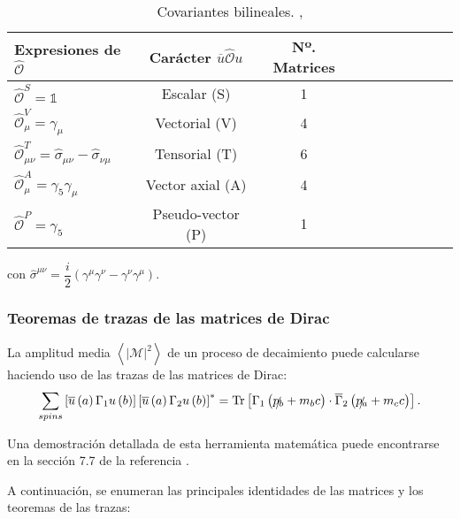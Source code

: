 \begin{table}[h]
	\centering
	\begin{tabular}{l*{8}{c}r}
\hline
Expresiones de $\widehat{\mathcal{O}}$  & Carácter $\overline{u}\widehat{\mathcal{O}}u$ & Nº. Matrices\\ 
\hline
$\widehat{\mathcal{O}}^{S} = \mathbb{1}$ & Escalar (S) & 1\\
$\widehat{\mathcal{O}}_{\mu}^{V} = \gamma_{\mu}$ & Vectorial (V) & 4 &\\
$\widehat{\mathcal{O}}^{T}_{\mu\nu} = \hat{\sigma}_{\mu\nu}-\widehat{\sigma}_{\nu\mu}$ & Tensorial (T) & 6\\
$\widehat{\mathcal{O}}_{\mu}^{A} = \gamma_{5}\gamma_{\mu}$ & Vector axial (A) & 4\\
$\widehat{\mathcal{O}}^{P} = \gamma_{5}$ & Pseudo-vector (P) & 1\\
\hline
	\end{tabular}
\caption[Covariantes bilineales]{Covariantes bilineales. \cite{MCR}, \cite{GreinerRQM}}
\label{tab:bilinear_covariant}
\end{table}

con $\hat{\sigma}^{\mu\nu}= \dfrac{i}{2} \left(\gamma^{\mu}\gamma^{\nu} - \gamma^{\nu}\gamma^{\mu} \right)$.

\subsubsection{Teoremas de trazas de las matrices de Dirac}\label{sec:trazas}
La amplitud media $\left\langle|\mathcal{M}|^2\right\rangle$ de un proceso de decaimiento puede calcularse haciendo uso de las trazas de las matrices de Dirac:
\begin{equation}
\sum _{spins}\left[ \overline{u}\left( a\right) \Gamma_{1}u\left( b\right) \right] \left[ \overline{u}\left( a\right) \Gamma _{2}u\left( b\right) \right] ^{\ast }= \operatorname{Tr}\left[ \Gamma _{1}\left( \slashed{p_{b}}+m_{b}c\right) \cdot \overline{\Gamma }_{2}\left( \slashed{p_{a}}+m_{c}c\right) \right].\label{eq:casimir_trick}
\end{equation}

Una demostración detallada de esta herramienta matemática puede encontrarse en la sección 7.7 de la referencia \cite{Griffiths2008}.

A continuación, se enumeran las principales identidades de las matrices y los teoremas de las trazas:

